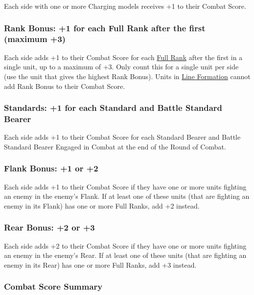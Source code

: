 Each side with one or more Charging models receives +1 to their Combat Score.

\subsubsection{Rank Bonus: +1 for each Full Rank after the first (maximum +3)}

Each side adds +1 to their Combat Score for each \hyperref[full_ranks]{Full Rank} after the first in a single unit, up to a maximum of +3. Only count this for a single unit per side (use the unit that gives the highest Rank Bonus). Units in \hyperref[line_formation]{Line Formation} cannot add Rank Bonus to their Combat Score.

\subsubsection{Standards: +1 for each Standard and Battle Standard Bearer}

Each side adds +1 to their Combat Score for each Standard Bearer and Battle Standard Bearer Engaged in Combat at the end of the Round of Combat.

\subsubsection{Flank Bonus: +1 or +2}

Each side adds +1 to their Combat Score if they have one or more units fighting an enemy in the enemy's Flank. If at least one of these units (that are fighting an enemy in its Flank) has one or more Full Ranks, add +2 instead.

\subsubsection{Rear Bonus: +2 or +3}

Each side adds +2 to their Combat Score if they have one or more units fighting an enemy in the enemy's Rear. If at least one of these units (that are fighting an enemy in its Rear) has one or more Full Ranks, add +3 instead.

\subsubsection{Combat Score Summary}

